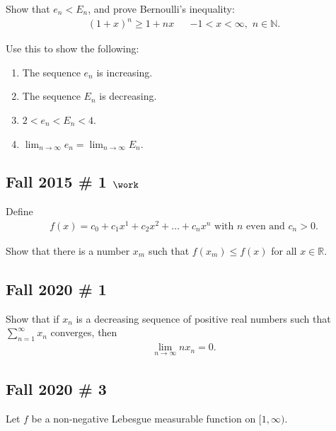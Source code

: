 Show that \(e_n < E_n\), and prove Bernoulli's inequality:
\begin{align*}
(1+x)^n \geq 1+nx && -1 < x < \infty  ,\,\, n\in {\mathbb{N}}
.\end{align*}

Use this to show the following:

\begin{enumerate}
\def\labelenumi{\arabic{enumi}.}
\tightlist
\item
  The sequence \(e_n\) is increasing.
\item
  The sequence \(E_n\) is decreasing.
\item
  \(2 < e_n < E_n < 4\).
\item
  \(\lim _{n \to \infty} e_{n} = \lim _{n \to \infty} E_{n}\).
\end{enumerate}

\hypertarget{fall-2015-1-work}{%
\subsection{\texorpdfstring{Fall 2015 \# 1
\(\work\)}{Fall 2015 \# 1 \textbackslash work}}\label{fall-2015-1-work}}

Define
\begin{align*}
f(x)=c_{0}+c_{1} x^{1}+c_{2} x^{2}+\ldots+c_{n} x^{n} \text { with } n \text { even and } c_{n}>0.
\end{align*}

Show that there is a number \(x_m\) such that \(f(x_m) \leq f(x)\) for
all \(x\in {\mathbb{R}}\).

\hypertarget{fall-2020-1}{%
\subsection{Fall 2020 \# 1}\label{fall-2020-1}}

Show that if \(x_n\) is a decreasing sequence of positive real numbers
such that \(\sum_{n=1}^\infty x_n\) converges, then
\begin{align*}
\lim_{n\to\infty} n x_n = 0.
\end{align*}

\hypertarget{fall-2020-3}{%
\subsection{Fall 2020 \# 3}\label{fall-2020-3}}

Let \(f\) be a non-negative Lebesgue measurable function on
\([1, \infty)\).

